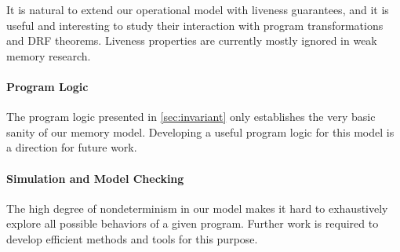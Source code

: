 It is natural to extend our operational model with liveness guarantees,
and it is useful and interesting to study their interaction with
 program transformations and DRF theorems.
Liveness properties are currently mostly ignored in weak memory research.



\paragraph{Program Logic}

The program logic presented in \cref{sec:invariant} only establishes the very basic sanity of our memory model.
Developing a useful program logic for this model is a direction for future work.

\paragraph{Simulation and Model Checking}

The high degree of nondeterminism in our model makes it hard to 
exhaustively explore all possible behaviors of a given program.
Further work is required to develop efficient methods and tools for this purpose.






